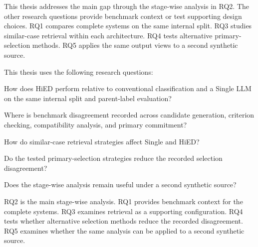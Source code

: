 This thesis addresses the main gap through the stage-wise analysis in RQ2. The other research questions provide benchmark context or test supporting design choices. RQ1 compares complete systems on the same internal split. RQ3 studies similar-case retrieval within each architecture. RQ4 tests alternative primary-selection methods. RQ5 applies the same output views to a second synthetic source.

This thesis uses the following research questions:

\begin{description}[style=nextline,leftmargin=1.5cm,labelwidth=1.1cm,itemsep=0pt,parsep=0pt,topsep=0pt,partopsep=0pt]
\item[RQ1] How does HiED perform relative to conventional classification and a Single LLM on the same internal split and parent-label evaluation?
\item[RQ2] Where is benchmark disagreement recorded across candidate generation, criterion checking, compatibility analysis, and primary commitment?
\item[RQ3] How do similar-case retrieval strategies affect Single and HiED?
\item[RQ4] Do the tested primary-selection strategies reduce the recorded selection disagreement?
\item[RQ5] Does the stage-wise analysis remain useful under a second synthetic source?
\end{description}

RQ2 is the main stage-wise analysis. RQ1 provides benchmark context for the complete systems. RQ3 examines retrieval as a supporting configuration. RQ4 tests whether alternative selection methods reduce the recorded disagreement. RQ5 examines whether the same analysis can be applied to a second synthetic source.
